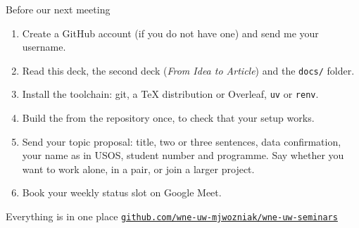 \documentclass[aspectratio=169,11pt,t]{beamer}
\newcommand{\repo}{\href{https://github.com/wne-uw-mjwozniak/wne-uw-seminars}{\texttt{github.com/wne-uw-mjwozniak/wne-uw-seminars}}}
\begin{document}
\begin{frame}{Before our next meeting}
  \begin{enumerate}
    \item Create a GitHub account (if you do not have one) and send me your username.
    \item Read this deck, the second deck (\emph{From Idea to Article}) and the \texttt{docs/} folder.
    \item Install the toolchain: git, a TeX distribution or Overleaf, \texttt{uv} or \texttt{renv}.
    \item Build the  from the repository once, to check that your setup works.
    \item Send your topic proposal: title, two or three sentences, data confirmation, your name as
          in USOS, student number and programme.
          Say whether you want to work alone, in a pair, or join a larger project.
    \item Book your weekly status slot on Google Meet.
  \end{enumerate}

  \bigskip
  \begin{block}{Everything is in one place}
    \centering\repo
  \end{block}
\end{frame}
\end{document}
